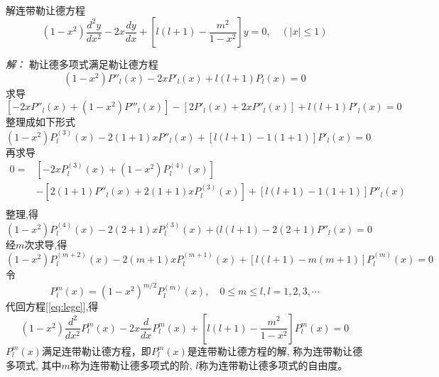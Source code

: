 	
	~~\\ 
	\begin{example}
		解连带勒让德方程
		\begin{equation*}
			\left(1-x^{2}\right) \frac{d^{2} y}{d x^{2}}-2 x \frac{d y}{d x}+\left[l(l+1)-\frac{m^{2}}{1-x^{2}}\right] y=0, \quad (|x|\le 1) 
		\end{equation*}
	\end{example}
	\emph{解：}
	勒让德多项式满足勒让德方程
	\[\left(1-x^{2}\right) P'' _l  (x) -2 x P' _l (x)+l(l+1)P_l(x)=0\]
	求导
	\[\left[-2x P'' _l  (x) + \left(1-x^{2}\right) P''' _l  (x)\right] - \left[2 P' _l (x) +2 x P'' _l (x) \right] + l(l+1)P'_l(x)=0 \]
	整理成如下形式
	\[\left(1-x^{2}\right) P^{(3)} _l (x) -2(1+1) x P'' _l (x)+\left[l(l+1)-1(1+1)\right]P'_l(x)=0	\]
	再求导
	\[ \begin{aligned}
		0=&\left[-2x P^{(3)}_l (x) + \left(1-x^{2}\right) P^{(4)} _l (x)\right] \\
		&- \left[2(1+1) P'' _l (x) +2(1+1) x P^{(3)} _l (x)\right] + \left[l(l+1)-1(1+1) \right] P''_l(x)\\ 
	\end{aligned}
	 \]
	整理,得
	\[\left(1-x^{2}\right) P^{(4)} _l  (x) -2(2+1) x P^{(3)} _l (x)+(l(l+1)-2(2+1)P''_l(x)=0\]
	经$m$次求导,得
	\begin{equation}\label{eq:lege}
			\left(1-x^{2}\right) P^{(m+2)} _l  (x) -2(m+1) x P^{(m+1)} _l (x)+\left[l(l+1)-m(m+1)\right]P^{(m)} _l(x)=0
	\end{equation}
	令 $$ \boxed{P^{m} _l(x)=(1-x^2)^{m/2}P^{(m)} _l(x), \quad 0\le m\le l, l=1,2,3,\cdots} $$
	代回方程[\ref{eq:lege}],得
	\begin{equation*}
		\left(1-x^{2}\right) \frac{d^{2}}{d x^{2}} P^m_{l}(x) -2 x \frac{d}{d x} P^m_{l}(x)+\left[l(l+1)-\frac{m^{2}}{1-x^{2}}\right] P^m_{l}(x)=0
	\end{equation*}		
	$P^m _{l}(x)$满足连带勒让德方程，即$P^m _{l}(x)$是连带勒让德方程的解, 称为连带勒让德多项式, 其中$m$称为连带勒让德多项式的阶, $l$称为连带勒让德多项式的自由度。
	
